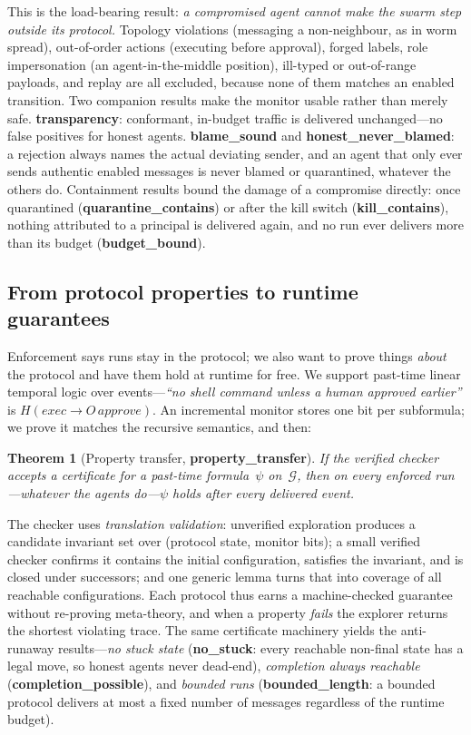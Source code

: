 \documentclass[10pt,twocolumn]{article}
\newtheorem{theorem}{Theorem}
\newcommand{\G}{\mathcal{G}}
\newcommand{\thm}[1]{\textcolor{dk}{\textbf{#1}}}
\begin{document}
\noindent This is the load-bearing result: \emph{a compromised agent cannot make the swarm step outside its
protocol.} Topology violations (messaging a non-neighbour, as in worm spread), out-of-order actions
(executing before approval), forged labels, role impersonation (an agent-in-the-middle position), ill-typed
or out-of-range payloads, and replay are all excluded, because none of them matches an enabled transition.
Two companion results make the monitor usable rather than merely safe. \thm{transparency}: conformant,
in-budget traffic is delivered unchanged---no false positives for honest agents. \thm{blame\_sound} and
\thm{honest\_never\_blamed}: a rejection always names the actual deviating sender, and an agent that only
ever sends authentic enabled messages is never blamed or quarantined, whatever the others do. Containment
results bound the damage of a compromise directly: once quarantined (\thm{quarantine\_contains}) or after
the kill switch (\thm{kill\_contains}), nothing attributed to a principal is delivered again, and no run
ever delivers more than its budget (\thm{budget\_bound}).

\subsection{From protocol properties to runtime guarantees}

Enforcement says runs stay in the protocol; we also want to prove things \emph{about} the protocol and have
them hold at runtime for free. We support past-time linear temporal logic over events---\emph{``no shell
command unless a human approved earlier''} is \(H(\mathit{exec}\to O\,\mathit{approve})\). An incremental
monitor stores one bit per subformula; we prove it matches the recursive semantics, and then:

\begin{theorem}[Property transfer, \thm{property\_transfer}]
If the verified checker accepts a certificate for a past-time formula~$\psi$ on~$\G$, then on every enforced
run---whatever the agents do---$\psi$ holds after every delivered event.
\end{theorem}

The checker uses \emph{translation validation}: unverified exploration produces a candidate invariant set
over (protocol state, monitor bits); a small verified checker confirms it contains the initial
configuration, satisfies the invariant, and is closed under successors; and one generic lemma turns that
into coverage of all reachable configurations. Each protocol thus earns a machine-checked guarantee without
re-proving meta-theory, and when a property \emph{fails} the explorer returns the shortest violating trace.
The same certificate machinery yields the anti-runaway results---\emph{no stuck state}
(\thm{no\_stuck}: every reachable non-final state has a legal move, so honest agents never dead-end),
\emph{completion always reachable} (\thm{completion\_possible}), and \emph{bounded runs}
(\thm{bounded\_length}: a bounded protocol delivers at most a fixed number of messages regardless of the
runtime budget).
\end{document}

